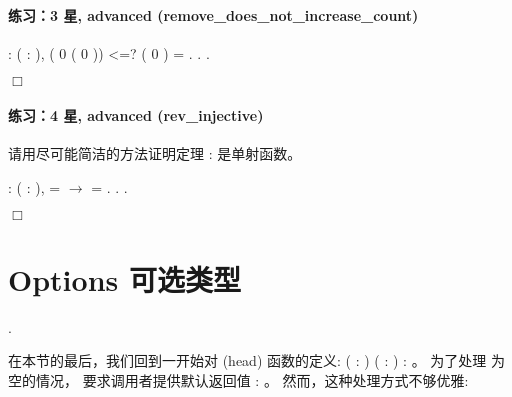 \documentclass[12pt]{report}
\begin{document}
{{{\paragraph{练习：3 星, advanced (remove\_does\_not\_increase\_count)}

\begin{coqdoccode}
\coqdocnoindent
{} : \coqdockw{\ensuremath{\forall}} ( : ),\coqdoceol
\coqdocindent{1.00em}
( 0 ( 0 )) <=? ( 0 ) = .\coqdoceol
\coqdocnoindent
{}.\coqdoceol
\coqdocnoindent
{}.\coqdoceol
\end{coqdoccode}
\ensuremath{\Box} 

\paragraph{练习：4 星, advanced (rev\_injective)}



  请用尽可能简洁的方法证明定理 :  是单射函数。
\begin{coqdoccode}
\coqdocnoindent
{}  : \coqdockw{\ensuremath{\forall}} (  : ), \coqdoceol
\coqdocindent{1.00em}
  =   \ensuremath{\rightarrow}  = .\coqdoceol
\coqdocnoindent
{}.\coqdoceol
\coqdocnoindent
{}.\coqdoceol
\end{coqdoccode}
\ensuremath{\Box} \begin{coqdoccode}
\end{coqdoccode}
\section{Options 可选类型}

\begin{coqdoccode}
\coqdocemptyline
\coqdocnoindent
{} .\coqdoceol
\end{coqdoccode}
  在本节的最后，我们回到一开始对  (head) 函数的定义:
    ( : ) ( : ) : 。
  为了处理  为空的情况， 要求调用者提供默认返回值  : 。
  然而，这种处理方式不够优雅:

}}}
\end{document}

